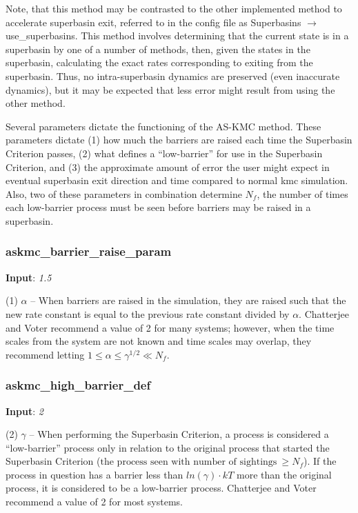 \documentclass{article}
\begin{document}
Note, that this method may be contrasted to the other implemented method to accelerate superbasin exit, referred to in the config file as Superbasins $\to$ use\_superbasins.  This method involves determining that the current state is in a superbasin by one of a number of methods, then, given the states in the superbasin, calculating the exact rates corresponding to exiting from the superbasin.  Thus, no intra-superbasin dynamics are preserved (even inaccurate dynamics), but it may be expected that less error might result from using the other method.

Several parameters dictate the functioning of the AS-KMC method.  These parameters dictate (1) how much the barriers are raised each time the Superbasin Criterion passes, (2) what defines a ``low-barrier'' for use in the Superbasin Criterion, and (3) the approximate amount of error the user might expect in eventual superbasin exit direction and time compared to normal kmc simulation.  Also, two of these parameters in combination determine $N_f$, the number of times each low-barrier process must be seen before barriers may be raised in a superbasin.

\subsubsection{askmc\_barrier\_raise\_param}

\noindent\textbf{Input}:  \emph{1.5}

(1) $\alpha$ -- When barriers are raised in the simulation, they are raised such that the new rate constant is equal to the previous rate constant divided by $\alpha$. Chatterjee and Voter recommend a value of 2 for many systems; however, when the time scales from the system are not known and time scales may overlap, they recommend letting $1 \le \alpha \le \gamma^{1/2} \ll N_f$.

\subsubsection{askmc\_high\_barrier\_def}

\noindent\textbf{Input}:  \emph{2}

(2) $\gamma$ -- When performing the Superbasin Criterion, a process is considered a ``low-barrier'' process only in relation to the original process that started the Superbasin Criterion ($\text{the process seen with number of sightings}~\ge N_f$).  If the process in question has a barrier less than  $ln(\gamma) \cdot kT$ more than the original process, it is considered to be a low-barrier process.  Chatterjee and Voter recommend a value of 2 for most systems.
\end{document}
